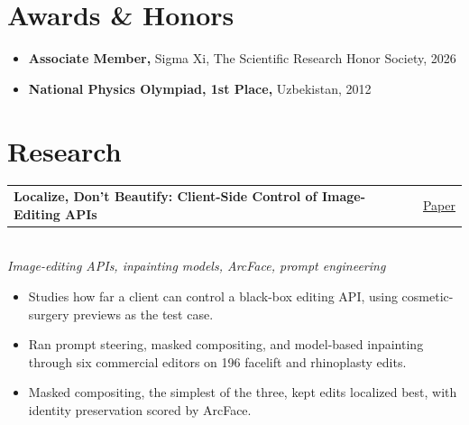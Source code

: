 \documentclass[letterpaper,11pt]{article}
\makeatletter
\newcommand{\projectEntryPaper}[4]{%
    \vspace{2pt}\noindent
    \begin{tabular*}{\textwidth}{@{}l@{\extracolsep{\fill}}r@{}}
        {\textbf{\color{accent}#1}} & {\small\href{#3}{\color{linkcolor}GitHub} \enspace\color{lighttext}\textbar\enspace \href{#4}{\color{linkcolor}Paper}} \\
    \end{tabular*}\vspace{-3pt}\\
    {\small\color{lighttext}\textit{#2}}\vspace{-2pt}
}
\newcommand{\projectEntryPaperOnly}[3]{%
    \vspace{2pt}\noindent
    \begin{tabular*}{\textwidth}{@{}l@{\extracolsep{\fill}}r@{}}
        {\textbf{\color{accent}#1}} & {\small\href{#3}{\color{linkcolor}Paper}} \\
    \end{tabular*}\vspace{-3pt}\\
    {\small\color{lighttext}\textit{#2}}\vspace{-2pt}
}
\makeatother
\begin{document}
\section{Awards \& Honors}
\begin{itemize}[itemsep=2pt]
    \item \textbf{Associate Member,} Sigma Xi, The Scientific Research Honor Society, 2026
    \item \textbf{National Physics Olympiad, 1st Place,} Uzbekistan, 2012
\end{itemize}

\section{Research}


\projectEntryPaperOnly{Localize, Don't Beautify: Client-Side Control of Image-Editing APIs}{Image-editing APIs, inpainting models, ArcFace, prompt engineering}
{https://arxiv.org/abs/2608.02841}
\begin{itemize}
    \item Studies how far a client can control a black-box editing API, using cosmetic-surgery previews as the test case.
    \item Ran prompt steering, masked compositing, and model-based inpainting through six commercial editors on 196 facelift and rhinoplasty edits.
    \item Masked compositing, the simplest of the three, kept edits localized best, with identity preservation scored by ArcFace.
\end{itemize}
\end{document}

